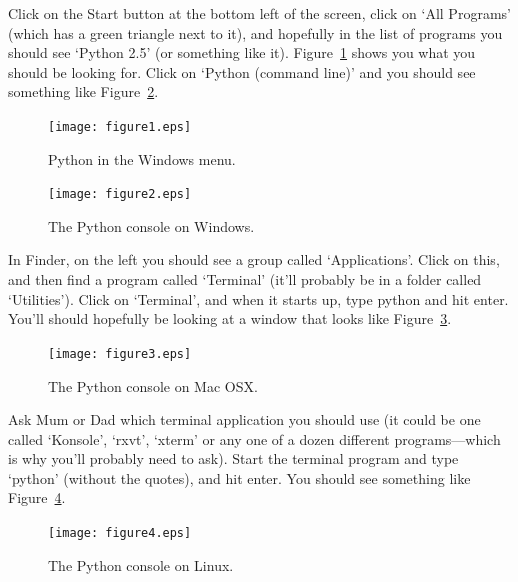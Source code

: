 \begin{WINDOWS}
Click on the Start button at the bottom left of the screen, click on `All Programs' (which has a green triangle next to it), and hopefully in the list of programs you should see `Python 2.5' (or something like it).  Figure~\ref{fig1} shows you what you should be looking for. Click on `Python (command line)' and you should see something like Figure~\ref{fig2}.

\begin{figure}
\begin{center}
\texttt{[image: figure1.eps]}
\end{center}
\caption{Python in the Windows menu.}\label{fig1}
\end{figure}

\begin{figure}
\begin{center}
\texttt{[image: figure2.eps]}
\end{center}
\caption{The Python console on Windows.}\label{fig2}
\end{figure}
\end{WINDOWS}

\begin{MAC}
In Finder, on the left you should see a group called `Applications'.  Click on this, and then find a program called `Terminal' (it'll probably be in a folder called `Utilities').
Click on `Terminal', and when it starts up, type python and hit enter.  You'll should hopefully be looking at a window that looks like Figure~\ref{fig3}.

\begin{figure}
\begin{center}
\texttt{[image: figure3.eps]}
\end{center}
\caption{The Python console on Mac OSX.}\label{fig3}
\end{figure}
\end{MAC}

\begin{LINUX}
Ask Mum or Dad which terminal application you should use (it could be one called `Konsole', `rxvt', `xterm' or any one of a dozen different programs---which is why you'll probably need to ask).  Start the terminal program and type `python' (without the quotes), and hit enter.  You should see something like Figure~\ref{fig4}.

\begin{figure}
\begin{center}
\texttt{[image: figure4.eps]}
\end{center}
\caption{The Python console on Linux.}\label{fig4}
\end{figure}
\end{LINUX}


